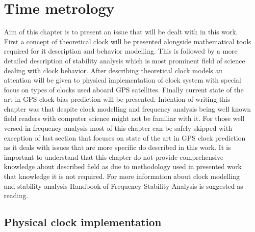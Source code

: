 \chapter{Time metrology}
Aim of this chapter is to present an issue that will be dealt with in this work.
First a concept of theoretical clock will be presented alongside mathematical tools required
for it description and behavior modelling.
This is followed by a more detailed description of stability analysis which is most prominent
field of science dealing with clock behavior.
After describing theoretical clock models an attention will be given to physical implementation
of clock system with special focus on types of clocks used aboard GPS satellites.
Finally current state of the art in GPS clock bias prediction will be presented.
Intention of writing this chapter was that despite clock modelling and frequency analysis being
well known field readers with computer science might not be familiar with it.
For those well versed in frequency analysis most of this chapter can be safely skipped with 
exception of last section that focuses on state of the art in GPS clock prediction as it 
deals with issues that are more specific do described in this work.
It is important to understand that this chapter do not provide comprehensive knowledge about
described field as due to methodology used in presented work that knowledge it is not required.
For more information about clock modelling and stability analysis Handbook of Frequency Stability
Analysis is suggested as reading.


\section{Physical clock implementation}
\label{sec:physical_clock}

